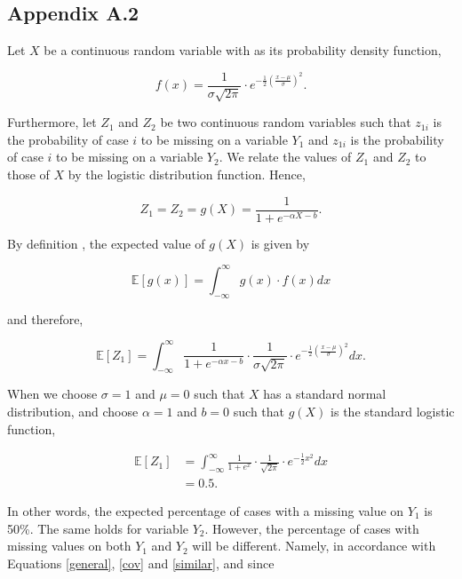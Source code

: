 \documentclass[11pt,a4paper]{article}
\begin{document}
\subsection*{Appendix A.2}

Let $X$ be a continuous random variable with as its probability density function, 

\begin{equation*}
f(x) = \frac{1}{\sigma\sqrt{2\pi}}\cdot e^{-\frac{1}{2}(\frac{x - \mu}{\sigma})^2}.
\end{equation*}

\noindent Furthermore, let $Z_1$ and $Z_2$ be two continuous random variables such that $z_{1i}$ is the probability of case $i$ to be missing on a variable $Y_1$ and $z_{1i}$ is the probability of case $i$ to be missing on a variable $Y_2$. We relate the values of $Z_1$ and $Z_2$ to those of $X$ by the logistic distribution function. Hence, 

\begin{equation*}
Z_1 = Z_2 = g(X) = \frac{1}{1 + e^{-\alpha X - b}}.
\end{equation*}

\noindent By definition \citep{Freund}, the expected value of $g(X)$ is given by 

\begin{equation*}
\mathbb{E}[g(x)] = \int_{-\infty}^\infty g(x) \cdot f(x) dx
\end{equation*}

\noindent and therefore, 

\begin{equation*}
\mathbb{E}[Z_1] = \int_{-\infty}^\infty \frac{1}{1 + e^{-\alpha x - b}} \cdot \frac{1}{\sigma\sqrt{2\pi}}\cdot e^{-\frac{1}{2}(\frac{x - \mu}{\sigma})^2} dx.
\end{equation*}

\noindent When we choose $\sigma = 1$ and $\mu = 0$ such that $X$ has a standard normal distribution, and choose $\alpha = 1$ and $b = 0$ such that $g(X)$ is the standard logistic function, 

\begin{align*}
\mathbb{E}[Z_1] & = \int_{-\infty}^\infty \frac{1}{1 + e^x} \cdot \frac{1}{\sqrt{2\pi}}\cdot e^{-\frac{1}{2}x^2} dx \nonumber \\
& = 0.5.
\end{align*}

\noindent In other words, the expected percentage of cases with a missing value on $Y_1$ is 50\%. The same holds for variable $Y_2$. However, the percentage of cases with missing values on both $Y_1$ and $Y_2$ will be different. Namely, in accordance with Equations \eqref{general}, \eqref{cov} and \eqref{similar}, and since 
\end{document}
